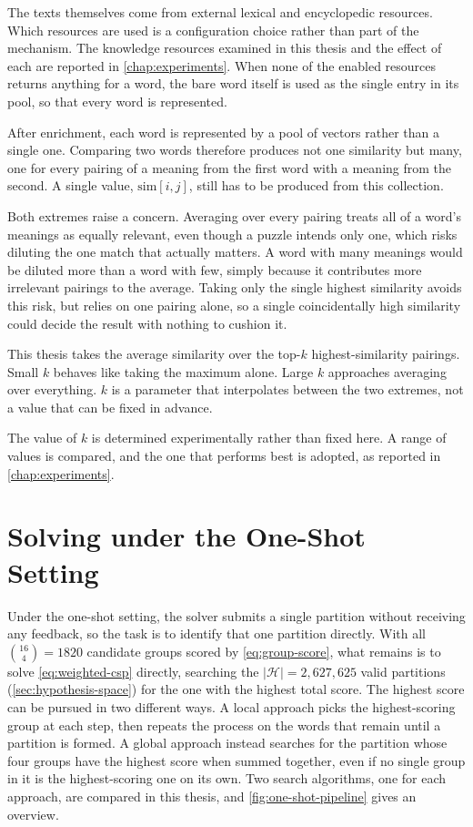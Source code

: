 The texts themselves come from external lexical and encyclopedic resources. Which resources are used is a configuration choice rather than part of the mechanism. The knowledge resources examined in this thesis and the effect of each are reported in \autoref{chap:experiments}. When none of the enabled resources returns anything for a word, the bare word itself is used as the single entry in its pool, so that every word is represented.

After enrichment, each word is represented by a pool of vectors rather than a single one. Comparing two words therefore produces not one similarity but many, one for every pairing of a meaning from the first word with a meaning from the second. A single value, $\text{sim}[i,j]$, still has to be produced from this collection.

Both extremes raise a concern. Averaging over every pairing treats all of a word's meanings as equally relevant, even though a puzzle intends only one, which risks diluting the one match that actually matters. A word with many meanings would be diluted more than a word with few, simply because it contributes more irrelevant pairings to the average. Taking only the single highest similarity avoids this risk, but relies on one pairing alone, so a single coincidentally high similarity could decide the result with nothing to cushion it.

This thesis takes the average similarity over the top-$k$ highest-similarity pairings. Small $k$ behaves like taking the maximum alone. Large $k$ approaches averaging over everything. $k$ is a parameter that interpolates between the two extremes, not a value that can be fixed in advance.

The value of $k$ is determined experimentally rather than fixed here. A range of values is compared, and the one that performs best is adopted, as reported in \autoref{chap:experiments}.

\section{Solving under the One-Shot Setting}
\label{sec:one-shot-solving}

Under the one-shot setting, the solver submits a single partition without receiving any feedback, so the task is to identify that one partition directly. With all $\binom{16}{4} = 1820$ candidate groups scored by \autoref{eq:group-score}, what remains is to solve \autoref{eq:weighted-csp} directly, searching the $|\mathcal{H}| = 2{,}627{,}625$ valid partitions (\autoref{sec:hypothesis-space}) for the one with the highest total score. The highest score can be pursued in two different ways. A local approach picks the highest-scoring group at each step, then repeats the process on the words that remain until a partition is formed. A global approach instead searches for the partition whose four groups have the highest score when summed together, even if no single group in it is the highest-scoring one on its own. Two search algorithms, one for each approach, are compared in this thesis, and \autoref{fig:one-shot-pipeline} gives an overview.

